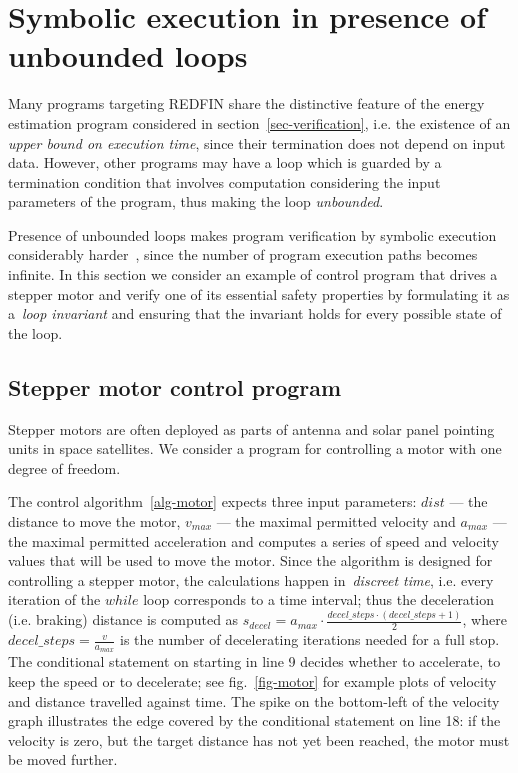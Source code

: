 \section{Symbolic execution in presence of unbounded loops\label{sec-motor-control}}

Many programs targeting REDFIN share the distinctive feature of
the energy estimation program considered in section~\ref{sec-verification},
i.e. the existence of an  \emph{upper bound on execution time},
since their termination does not depend on input data.
However, other programs may have a loop
which is guarded by a termination condition that involves computation
considering the input parameters of the program, thus making the loop
\emph{unbounded}.

Presence of unbounded loops makes program verification by symbolic execution considerably
harder~\cite[p.~50:20]{SurveySymExec-CSUR18}, since the number of program execution
paths becomes infinite. In this section we consider an example
of control program that drives a stepper motor and verify one of its essential
safety properties by formulating it as a~\emph{loop invariant} and ensuring that the
invariant holds for every possible state of the loop.

\subsection{Stepper motor control program}

Stepper motors are often deployed as parts of antenna and solar panel pointing units
in space satellites. We consider a program for controlling a motor with
one degree of freedom.

The control algorithm~\ref{alg-motor} expects three input
parameters: $dist$ --- the distance to move the motor, $v_{max}$ --- the maximal permitted
velocity and $a_{max}$ --- the maximal permitted acceleration and computes a series of
speed and velocity values that will be used to move the motor. Since the algorithm is
designed for controlling a stepper motor, the calculations happen in~\emph{discreet time},
i.e. every iteration of the $while$ loop corresponds to a time interval; thus
the deceleration (i.e. braking) distance is computed as
$s_{decel} = a_{max} \cdot \frac{decel\_steps \cdot (decel\_steps + 1)}{2}$, where
$decel\_steps = \frac{v}{a_{max}}$ is the number of decelerating iterations
needed for a full stop. The conditional statement on starting in line 9 decides whether
to accelerate, to keep the speed or to decelerate;
see fig.~\ref{fig-motor} for example plots of velocity and distance travelled
against time. The spike on the bottom-left of the velocity graph illustrates
the edge covered by the conditional statement on line 18: if the velocity is zero, but the target
distance has not yet been reached, the motor must be moved further.

